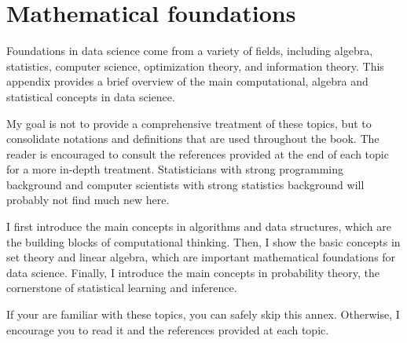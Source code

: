 \chapter{Mathematical foundations}
\label{chap:preliminaries}
\glsresetall


Foundations in data science come from a variety of fields, including
algebra, statistics, computer science, optimization theory, and information theory.
This appendix provides a brief overview of the main computational, algebra and statistical
concepts in data science.

My goal is not to provide a comprehensive treatment of these topics, but to consolidate
notations and definitions that are used throughout the book.  The reader is encouraged to
consult the references provided at the end of each topic for a more in-depth treatment.
Statisticians with strong programming background and computer scientists with strong
statistics background will probably not find much new here.

I first introduce the main concepts in algorithms and data structures, which are the
building blocks of computational thinking.  Then, I show the basic concepts in set
theory and linear algebra, which are important mathematical foundations for data science.
Finally, I introduce the main concepts in probability theory, the cornerstone of
statistical learning and inference.

If your are familiar with these topics, you can safely skip this annex.  Otherwise, I
encourage you to read it and the references provided at each topic.

